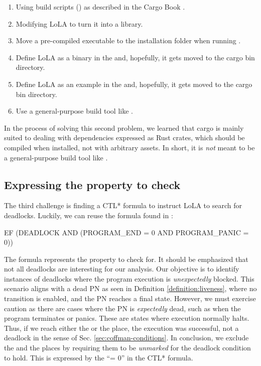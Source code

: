 \begin{enumerate}
  \item Using build scripts () as described in the Cargo Book \cite[Chap. 3.8]{cargo-book}.
  \item Modifying \acrshort{LoLA} to turn it into a library.
  \item Move a pre-compiled executable to the installation folder when running .
  \item Define \acrshort{LoLA} as a binary in the  \cite[Chap 3.2.1]{cargo-book}
        and, hopefully, it gets moved to the cargo bin directory.
  \item Define \acrshort{LoLA} as an example in the  \cite[Chap 3.2.1]{cargo-book}
        and, hopefully, it gets moved to the cargo bin directory.
  \item Use a general-purpose build tool like .
\end{enumerate}

In the process of solving this second problem,
we learned that cargo is mainly suited to dealing with dependencies
expressed as Rust crates, which should be compiled when installed, not with arbitrary assets.
In short, it is \emph{not} meant to be a general-purpose build tool like .

\subsection{Expressing the property to check}

The third challenge is finding a \acrfull{CTL*} formula to instruct \acrshort{LoLA}
to search for deadlocks.
Luckily, we can reuse the formula found in \cite{meyer2020}:

\begin{center}
  EF (DEADLOCK AND (PROGRAM\_END = 0 AND PROGRAM\_PANIC = 0))
\end{center}

The formula represents the property to check for.
It should be emphasized that not all deadlocks are interesting for our analysis.
Our objective is to identify instances of deadlocks
where the program execution is \emph{unexpectedly} blocked.
This scenario aligns with a dead \acrshort{PN} as seen in Definition \ref{definition:liveness},
where no transition is enabled, and the \acrshort{PN} reaches a final state.
However, we must exercise caution as there are cases where the \acrshort{PN} is \emph{expectedly} dead,
such as when the program terminates or panics.
These are states where execution normally halts.
Thus, if we reach either the  or the  place,
the execution was successful, not a deadlock in the sense of Sec. \ref{sec:coffman-conditions}.
In conclusion, we exclude the  and the  places
by requiring them to be \emph{unmarked} for the deadlock condition to hold.
This is expressed by the ``= 0'' in the \acrshort{CTL*} formula.

